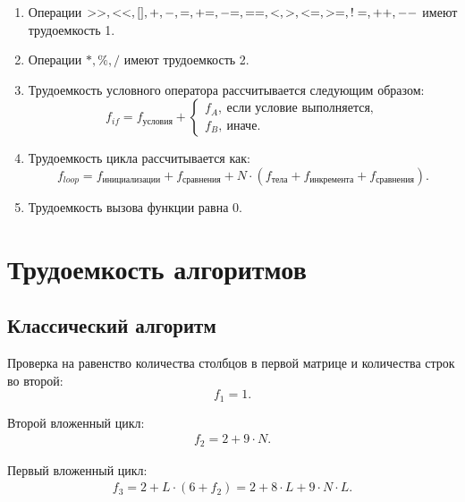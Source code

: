 \begin{enumerate}
\item
Операции $>>, <<, [], +, -, =, \mathrel{+}=, \mathrel{-}=, ==, <, >, <=, >=,  !=, ++, --$ имеют трудоемкость 1.

\item
Операции $*, \%, /$ имеют трудоемкость 2.

\item
Трудоемкость условного оператора рассчитывается следующим образом:
\begin{equation}
f_{if} = f_{\text{условия}} +
	\begin{cases}
    f_A,~\text{если условие выполняется}, \\
    f_B,~\text{иначе}.
    \end{cases}
\end{equation}

\item
Трудоемкость цикла рассчитывается как:
\begin{equation}
f_{loop} = f_{\text{инициализации}} + f_{\text{сравнения}} + N \cdot (f_{\text{тела}} + f_{\text{инкремента}} +  f_{\text{сравнения}}).
\end{equation}

\item
Трудоемкость вызова функции равна 0.
\end{enumerate}

\section{Трудоемкость алгоритмов}

\subsection{Классический алгоритм}

Проверка на равенство количества столбцов в первой матрице и количества строк во второй:
\begin{equation}
f_1 = 1.
\end{equation}

Второй вложенный цикл:
\begin{equation}
\begin{gathered}
f_2 = 2 + 9 \cdot N.
\end{gathered}
\end{equation}

Первый вложенный цикл:
\begin{equation}
\begin{gathered}
f_3 = 2 + L \cdot (6 + f_2) = 2 + 8 \cdot L + 9 \cdot N \cdot L.
\end{gathered}
\end{equation}

